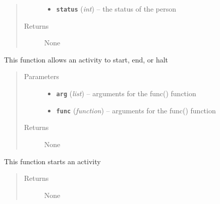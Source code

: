 \documentclass[letterpaper,10pt,english]{sphinxmanual}
\begin{document}
\begin{fulllineitems}
\begin{fulllineitems}
\begin{quote}
\begin{description}
\begin{itemize}
\item {} 
\textbf{\texttt{status}} (\emph{int}) -- the status of the person

\end{itemize}

\item[{Returns}] \leavevmode
None

\end{description}\end{quote}

\end{fulllineitems}


\begin{fulllineitems}
\label{state:state.State.run_activity}
This function allows an activity to start, end, or halt
\begin{quote}\begin{description}
\item[{Parameters}] \leavevmode\begin{itemize}
\item {} 
\textbf{\texttt{arg}} (\emph{list}) -- arguments for the func() function

\item {} 
\textbf{\texttt{func}} (\emph{function}) -- arguments for the func() function

\end{itemize}

\item[{Returns}] \leavevmode
None

\end{description}\end{quote}

\end{fulllineitems}


\begin{fulllineitems}
\label{state:state.State.start_activity}
This function starts an activity
\begin{quote}\begin{description}
\item[{Returns}] \leavevmode
None

\end{description}\end{quote}


\end{fulllineitems}
\end{fulllineitems}
\end{document}
